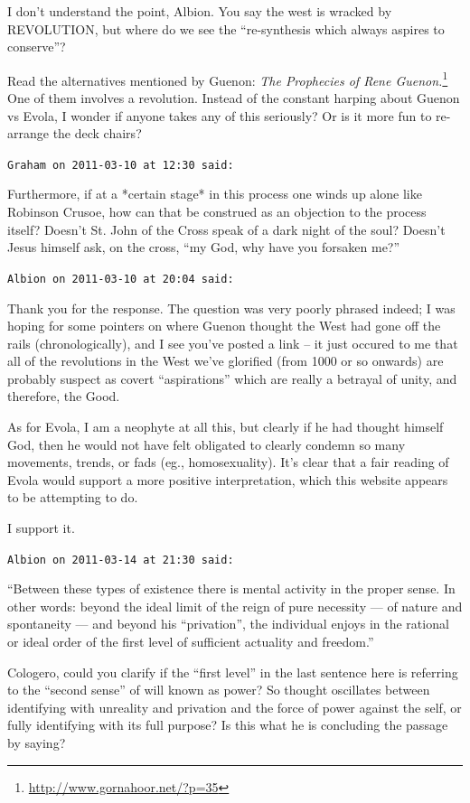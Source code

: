\begin{footnotesize}
\begin{sffamily}
I don't understand the point, Albion. You say the west is wracked by REVOLUTION, but where do we see the ``re-synthesis which always aspires to conserve''?

Read the alternatives mentioned by Guenon:
\textit{The Prophecies of Rene Guenon.}\footnote{\url{http://www.gornahoor.net/?p=35}} One of them involves a revolution. Instead of the constant harping about Guenon vs Evola, I wonder if anyone takes any of this seriously? Or is it more fun to re-arrange the deck chairs?

\hfill

\texttt{Graham on 2011-03-10 at 12:30 said:}

Furthermore, if at a *certain stage* in this process one winds up alone like Robinson Crusoe, how can that be construed as an objection to the process itself? Doesn't St. John of the Cross speak of a dark night of the soul? Doesn't Jesus himself ask, on the cross, ``my God, why have you forsaken me?''

\hfill

\texttt{Albion on 2011-03-10 at 20:04 said:}

Thank you for the response. The question was very poorly phrased indeed; I was hoping for some pointers on where Guenon thought the West had gone off the rails (chronologically), and I see you've posted a link -- it just occured to me that all of the revolutions in the West we've glorified (from 1000 or so onwards) are probably suspect as covert ``aspirations'' which are really a betrayal of unity, and therefore, the Good.

As for Evola, I am a neophyte at all this, but clearly if he had thought himself God, then he would not have felt obligated to clearly condemn so many movements, trends, or fads (eg., homosexuality). It's clear that a fair reading of Evola would support a more positive interpretation, which this website appears to be attempting to do.

I support it.

\hfill


\texttt{Albion on 2011-03-14 at 21:30 said:}

``Between these types of existence there is mental activity in the proper sense. In other words: beyond the ideal limit of the reign of pure necessity --- of nature and spontaneity --- and beyond his ``privation'', the individual enjoys in the rational or ideal order of the first level of sufficient actuality and freedom.''

Cologero, could you clarify if the ``first level'' in the last sentence here is referring to the ``second sense'' of will known as power? So thought oscillates between identifying with unreality and privation and the force of power against the self, or fully identifying with its full purpose? Is this what he is concluding the passage by saying?


\end{sffamily}
\end{footnotesize}
